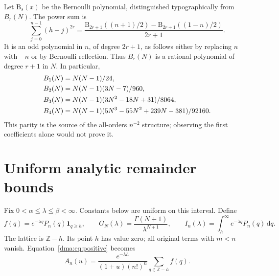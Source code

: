 \documentclass[11pt,letterpaper]{article}
\theoremstyle{remark}\newtheorem{remark}[theorem]{Remark}
\newcommand{\dd}{\mathrm d}
\begin{document}
Let $\mathrm B_s(x)$ be the Bernoulli polynomial, distinguished typographically from $B_r(N)$. The power sum is
\[
 \sum_{j=0}^{n-1}(h-j)^{2r}
 =\frac{\mathrm B_{2r+1}((n+1)/2)-\mathrm B_{2r+1}((1-n)/2)}{2r+1}.
\]
It is an odd polynomial in $n$, of degree $2r+1$, as follows either by replacing $n$ with $-n$ or by Bernoulli reflection. Thus $B_r(N)$ is a rational polynomial of degree $r+1$ in $N$. In particular,
\begin{align}
 B_1(N)&=N(N-1)/24,\notag\\
 B_2(N)&=N(N-1)(3N-7)/960,\notag\\
 B_3(N)&=N(N-1)(3N^2-18N+31)/8064,\label{dma:eq:B}\\
 B_4(N)&=N(N-1)(5N^3-55N^2+239N-381)/92160.\notag
\end{align}
This parity is the source of the all-orders $n^{-2}$ structure; observing the first coefficients alone would not prove it.

\section{Uniform analytic remainder bounds}\label{dma:sec:proof}
Fix $0<\alpha\leq\lambda\leq\beta<\infty$. Constants below are uniform on this interval. Define
\[
 f(q)=e^{-\lambda q}P_n(q)\boldsymbol1_{q\geq h},\qquad
 G_N(\lambda)=\frac{\Gamma(N+1)}{\lambda^{N+1}},\qquad
 I_n(\lambda)=\int_h^\infty e^{-\lambda q}P_n(q)\,\dd q.
\]
The lattice is $\mathbb Z-h$. Its point $h$ has value zero; all original terms with $m<n$ vanish. Equation~\eqref{dma:eq:positive} becomes
\begin{equation}\label{dma:eq:lattice}
 A_n(u)=\frac{e^{-\lambda h}}{(1+u)(n!)^n}
 \sum_{q\in\mathbb Z-h}f(q).
\end{equation}
\end{document}
